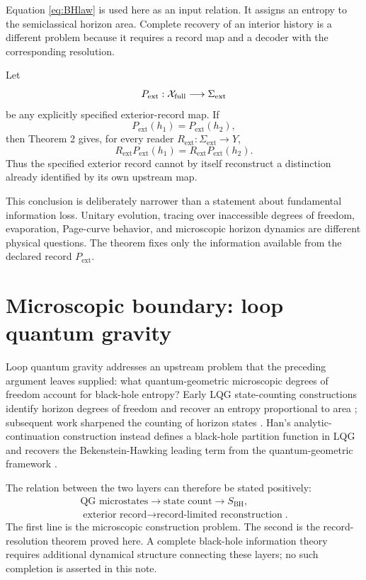 \documentclass[aps,prd,reprint,nofootinbib,superscriptaddress]{revtex4-2}
\newcommand{\BH}{\mathrm{BH}}
\newcommand{\ext}{\mathrm{ext}}
\begin{document}
Equation \eqref{eq:BHlaw} is used here as an input relation. It assigns an entropy to the semiclassical horizon area. Complete recovery of an interior history is a different problem because it requires a record map and a decoder with the corresponding resolution.

Let
\begin{equation}
P_{\ext}:\mathcal X_{\rm full}\longrightarrow\Sigma_{\ext}
\label{eq:extrecord}
\end{equation}
be any explicitly specified exterior-record map. If
\begin{equation}
P_{\ext}(h_1)=P_{\ext}(h_2),
\end{equation}
then Theorem 2 gives, for every reader $R_{\ext}:\Sigma_{\ext}\to Y$,
\begin{equation}
R_{\ext}P_{\ext}(h_1)=R_{\ext}P_{\ext}(h_2).
\label{eq:exttheorem}
\end{equation}
Thus the specified exterior record cannot by itself reconstruct a distinction already identified by its own upstream map.

This conclusion is deliberately narrower than a statement about fundamental information loss. Unitary evolution, tracing over inaccessible degrees of freedom, evaporation, Page-curve behavior, and microscopic horizon dynamics are different physical questions. The theorem fixes only the information available from the declared record $P_{\ext}$.

\section{Microscopic boundary: loop quantum gravity}

Loop quantum gravity addresses an upstream problem that the preceding argument leaves supplied: what quantum-geometric microscopic degrees of freedom account for black-hole entropy? Early LQG state-counting constructions identify horizon degrees of freedom and recover an entropy proportional to area \cite{Rovelli1996,AshtekarEtAl1998}; subsequent work sharpened the counting of horizon states \cite{DomagalaLewandowski2004}. Han's analytic-continuation construction instead defines a black-hole partition function in LQG and recovers the Bekenstein-Hawking leading term from the quantum-geometric framework \cite{Han2014}.

The relation between the two layers can therefore be stated positively:
\begin{align}
\boxed{\text{QG microstates}\longrightarrow\text{state count}\longrightarrow S_{\BH}},
\label{eq:boundaryA}\\
\boxed{\text{exterior record}\longrightarrow\text{record-limited reconstruction}}.
\label{eq:boundaryB}
\end{align}
The first line is the microscopic construction problem. The second is the record-resolution theorem proved here. A complete black-hole information theory requires additional dynamical structure connecting these layers; no such completion is asserted in this note.
\end{document}
